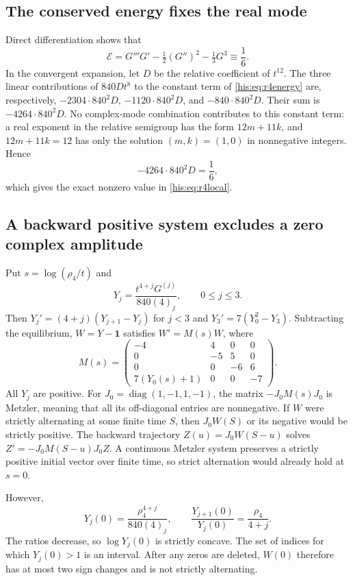 \subsection{The conserved energy fixes the real mode}
Direct differentiation shows that
\begin{equation}\label{his:eq:r4energy}
 \mathcal E=G'''G'-\tfrac12(G'')^2-\tfrac13G^3\equiv\frac16.
\end{equation}
In the convergent expansion, let $D$ be the relative coefficient of $t^{12}$. The three linear contributions of $840Dt^8$ to the constant term of \eqref{his:eq:r4energy} are, respectively,
$-2304\cdot840^2D$, $-1120\cdot840^2D$, and $-840\cdot840^2D$. Their sum is $-4264\cdot840^2D$.
No complex-mode combination contributes to this constant term: a real exponent in the relative semigroup has the form $12m+11k$, and $12m+11k=12$ has only the solution $(m,k)=(1,0)$ in nonnegative integers. Hence
\[
 -4264\cdot840^2D=\frac16,
\]
which gives the exact nonzero value in \eqref{his:eq:r4local}.

\subsection{A backward positive system excludes a zero complex amplitude}
Put $s=\log(\rho_4/t)$ and
\[
 Y_j=\frac{t^{4+j}G^{(j)}}{840(4)_j},\qquad 0\le j\le3.
\]
Then $Y_j'=(4+j)(Y_{j+1}-Y_j)$ for $j<3$ and $Y_3'=7(Y_0^2-Y_3)$. Subtracting the equilibrium, $W=Y-\mathbf1$ satisfies $W'=M(s)W$, where
\[
 M(s)=\begin{pmatrix}
 -4&4&0&0\\0&-5&5&0\\0&0&-6&6\\7(Y_0(s)+1)&0&0&-7
 \end{pmatrix}.
\]
All $Y_j$ are positive. For $J_0=\operatorname{diag}(1,-1,1,-1)$, the matrix $-J_0M(s)J_0$ is Metzler, meaning that all its off-diagonal entries are nonnegative. If $W$ were strictly alternating at some finite time $S$, then $J_0W(S)$ or its negative would be strictly positive. The backward trajectory $Z(u)=J_0W(S-u)$ solves $Z'=-J_0M(S-u)J_0Z$. A continuous Metzler system preserves a strictly positive initial vector over finite time, so strict alternation would already hold at $s=0$.

However,
\[
 Y_j(0)=\frac{\rho_4^{4+j}}{840(4)_j},\qquad
 \frac{Y_{j+1}(0)}{Y_j(0)}=\frac{\rho_4}{4+j}.
\]
The ratios decrease, so $\log Y_j(0)$ is strictly concave. The set of indices for which $Y_j(0)>1$ is an interval. After any zeros are deleted, $W(0)$ therefore has at most two sign changes and is not strictly alternating.

